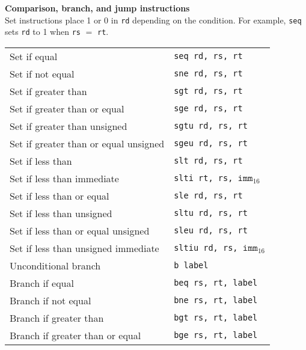 \documentclass{article}
\newcommand{\pseudo}{{\ensuremath\ast}}
\begin{document}
\newpage
\noindent
\textbf{Comparison, branch, and jump instructions} \\
Set instructions place 1 or 0 in {\tt rd} depending on the
condition.
For example, {\tt seq} sets {\tt rd} to 1 when
{\tt rs} $=$ {\tt rt}.
\begin{center}
\begin{tabular}{ll}
Set if equal & {\tt seq rd, rs, rt} \\
Set if not equal & {\tt sne rd, rs, rt} \\
Set if greater than\pseudo & {\tt sgt rd, rs, rt} \\
Set if greater than or equal\pseudo & {\tt sge rd, rs, rt} \\
Set if greater than unsigned\pseudo & {\tt sgtu rd, rs, rt} \\
Set if greater than or equal unsigned\pseudo & {\tt sgeu rd, rs, rt} \\
Set if less than & {\tt slt rd, rs, rt} \\
Set if less than immediate & {\tt slti rt, rs, }$\mathtt{imm}_{16}$ \\
Set if less than or equal\pseudo & {\tt sle rd, rs, rt} \\
Set if less than unsigned & {\tt sltu rd, rs, rt} \\
Set if less than or equal unsigned\pseudo & {\tt sleu rd, rs, rt} \\
Set if less than unsigned immediate & {\tt sltiu rd, rs, }$\mathtt{imm}_{16}$ \\
Unconditional branch\pseudo & {\tt b label} \\
Branch if equal & {\tt beq rs, rt, label} \\
Branch if not equal & {\tt bne rs, rt, label} \\
Branch if greater than\pseudo & {\tt bgt rs, rt, label} \\
Branch if greater than or equal\pseudo & {\tt bge rs, rt, label} \\

\end{tabular}
\end{center}
\end{document}
